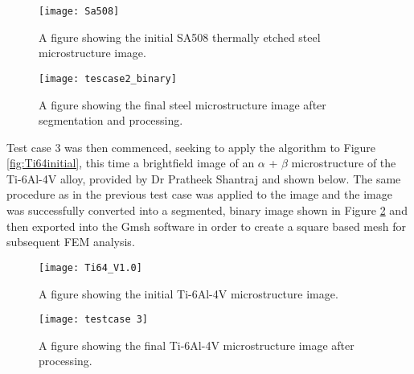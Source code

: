 \documentclass[\report.tex]{subfiles}
\begin{document}
\begin{figure}[!htb]
  \centering
  \begin{minipage}[!htb]{.5\textwidth}
    \centering\captionsetup{width=.8\linewidth}%
    \texttt{[image: Sa508]}
    \caption{A figure showing the initial SA508 thermally etched steel microstructure image.}\label{fig:SA508}
  \end{minipage}%
  \begin{minipage}[!htb]{.5\textwidth}
    \centering\captionsetup{width=.8\linewidth}%
    \texttt{[image: tescase2\_binary]}
    \caption{A figure showing the final steel microstructure image after segmentation and processing.}\label{fig:SA508_2}
  \end{minipage}
\end{figure}

\pagebreak

\noindent Test case 3 was then commenced, seeking to apply the algorithm to Figure \ref{fig:Ti64initial}, this time a brightfield image of an $\alpha$ + $\beta$ microstructure of the Ti-6Al-4V alloy, provided by Dr Pratheek Shantraj and shown below. The same procedure as in the previous test case was applied to the image and the image was successfully converted into a segmented, binary image shown in Figure \ref{fig:Ti64_2} and then exported into the Gmsh software in order to create a square based mesh for subsequent FEM analysis.\\

\begin{figure}[!htb]
  \centering
  \begin{minipage}[!htb]{.5\textwidth}
    \centering\captionsetup{width=.8\linewidth}%
    \texttt{[image: Ti64\_V1.0]}
    \caption{A figure showing the initial Ti-6Al-4V microstructure image.}\label{fig:Ti64initial}
  \end{minipage}%
  \begin{minipage}[!htb]{.5\textwidth}
    \centering\captionsetup{width=.8\linewidth}%
    \texttt{[image: testcase 3]}
    \caption{A figure showing the final Ti-6Al-4V microstructure image after processing.}\label{fig:Ti64_2}
  \end{minipage}
\end{figure}
\end{document}
